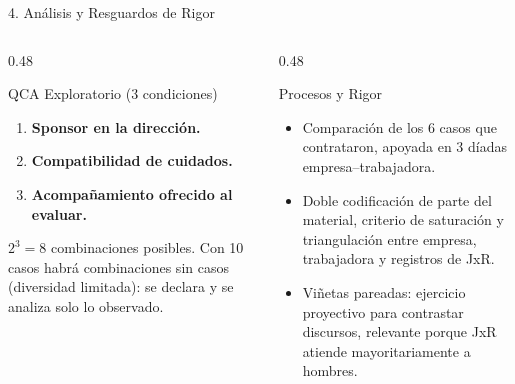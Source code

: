 \documentclass[aspectratio=169, 10pt]{beamer}
\begin{document}
\begin{frame}{4. Análisis y Resguardos de Rigor}
  \begin{columns}[T]
    \begin{column}{0.48\textwidth}
      \begin{block}{QCA Exploratorio (3 condiciones)}
        \small
        \begin{enumerate}
          \item \textbf{Sponsor en la dirección.}
          \item \textbf{Compatibilidad de cuidados.}
          \item \textbf{Acompañamiento ofrecido al evaluar.}
        \end{enumerate}
        $2^3 = 8$ combinaciones posibles. Con 10 casos habrá combinaciones sin casos (diversidad limitada): se declara y se analiza solo lo observado.
      \end{block}
    \end{column}
    \begin{column}{0.48\textwidth}
      \begin{block}{Procesos y Rigor}
        \small
        \begin{itemize}
          \item Comparación de los 6 casos que contrataron, apoyada en 3 díadas empresa--trabajadora.
          \item Doble codificación de parte del material, criterio de saturación y triangulación entre empresa, trabajadora y registros de JxR.
          \item Viñetas pareadas: ejercicio proyectivo para contrastar discursos, relevante porque JxR atiende mayoritariamente a hombres.
        \end{itemize}
      \end{block}
    \end{column}
  \end{columns}
\end{frame}
\end{document}
